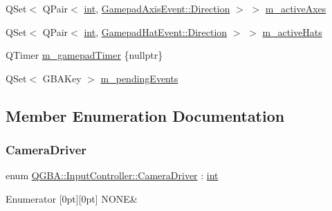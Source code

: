 \begin{DoxyCompactItemize}
\item 
Q\+Set$<$ Q\+Pair$<$ \mbox{\hyperlink{ioapi_8h_a787fa3cf048117ba7123753c1e74fcd6}{int}}, \mbox{\hyperlink{class_q_g_b_a_1_1_gamepad_axis_event_a5d50ab74dce4e58252f2affb5f227bbc}{Gamepad\+Axis\+Event\+::\+Direction}} $>$ $>$ \mbox{\hyperlink{class_q_g_b_a_1_1_input_controller_a3c48b07eaca878475ece5c4ccec3422c}{m\+\_\+active\+Axes}}
\item 
Q\+Set$<$ Q\+Pair$<$ \mbox{\hyperlink{ioapi_8h_a787fa3cf048117ba7123753c1e74fcd6}{int}}, \mbox{\hyperlink{class_q_g_b_a_1_1_gamepad_hat_event_ae3f20662c61b054e5344aafb9d843837}{Gamepad\+Hat\+Event\+::\+Direction}} $>$ $>$ \mbox{\hyperlink{class_q_g_b_a_1_1_input_controller_ac5bb2ca598c0cce6200450213b249cd9}{m\+\_\+active\+Hats}}
\item 
Q\+Timer \mbox{\hyperlink{class_q_g_b_a_1_1_input_controller_adb6f8d1dcf8ff24755807aa5b27abdf3}{m\+\_\+gamepad\+Timer}} \{nullptr\}
\item 
Q\+Set$<$ G\+B\+A\+Key $>$ \mbox{\hyperlink{class_q_g_b_a_1_1_input_controller_ae8399050cd2fb04137e05c43d4de6ce0}{m\+\_\+pending\+Events}}
\end{DoxyCompactItemize}


\subsection{Member Enumeration Documentation}
\mbox{\label{class_q_g_b_a_1_1_input_controller_af93ed1b611844d8b6cb4bc9c593b816e}} 
\subsubsection{\texorpdfstring{Camera\+Driver}{CameraDriver}}
{\footnotesize\ttfamily enum \mbox{\hyperlink{class_q_g_b_a_1_1_input_controller_af93ed1b611844d8b6cb4bc9c593b816e}{Q\+G\+B\+A\+::\+Input\+Controller\+::\+Camera\+Driver}} \+: \mbox{\hyperlink{ioapi_8h_a787fa3cf048117ba7123753c1e74fcd6}{int}}\hspace{0.3cm}{\ttfamily [strong]}}

\begin{DoxyEnumFields}{Enumerator}
[0pt][0pt]{}\mbox{\label{class_q_g_b_a_1_1_input_controller_af93ed1b611844d8b6cb4bc9c593b816eab50339a10e1de285ac99d4c3990b8693}} 
N\+O\+NE&\\
\hline

\end{DoxyEnumFields}


